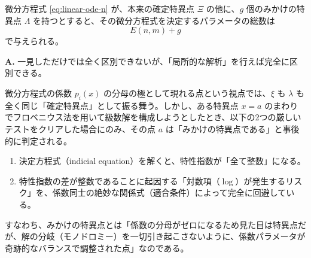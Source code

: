 \begin{proposition}
    微分方程式 \eqref{eq:linear-ode-n} が、本来の確定特異点 $\Xi$ の他に、$g$ 個のみかけの特異点 $\Lambda$ を持つとすると、その微分方程式を決定するパラメータの総数は
    \[
    E(n,m)+g
    \]
    で与えられる。
\end{proposition}

\begin{Q}
\textbf{A.} 一見しただけでは全く区別できないが、「局所的な解析」を行えば完全に区別できる。

微分方程式の係数 $p_i(x)$ の分母の極として現れる点という視点では、$\xi$ も $\lambda$ も全く同じ「確定特異点」として振る舞う。しかし、ある特異点 $x=a$ のまわりでフロベニウス法を用いて級数解を構成しようとしたとき、以下の2つの厳しいテストをクリアした場合にのみ、その点 $a$ は「みかけの特異点である」と事後的に判定される。
\begin{enumerate}
    \item 決定方程式（indicial equation）を解くと、特性指数が「全て整数」になる。
    \item 特性指数の差が整数であることに起因する「対数項（$\log$）が発生するリスク」を、係数同士の絶妙な関係式（適合条件）によって完全に回避している。
\end{enumerate}
すなわち、みかけの特異点とは「係数の分母がゼロになるため見た目は特異点だが、解の分岐（モノドロミー）を一切引き起こさないように、係数パラメータが奇跡的なバランスで調整された点」なのである。
\end{Q}

